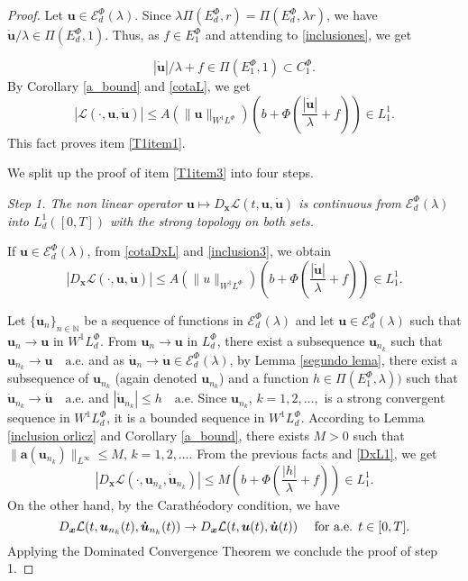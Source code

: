\documentclass[twoside]{article}
\theoremstyle{remark}
\newcommand{\lphi}{L^{\Phi}}
\newcommand{\ephi}{E^{\Phi}}
\newcommand{\claseor}{C^{\Phi}}
\newcommand{\wphi}{W^{1}\lphi}
\newcommand{\sobnor}{\|_{W^{1}\lphi}}
\newcommand{\domi}{\mathcal{E}^{\Phi}_d(\lambda)}
\renewcommand{\b}[1]{\boldsymbol{#1}}
\renewcommand{\leq}{\leqslant}
\begin{document}
\begin{proof} Let $\b{u}\in \domi$.
 Since  $\lambda\Pi(\ephi_d,r)=\Pi(\ephi_d,\lambda r)$, we have   $\b{\dot{u}}/\lambda\in\Pi(\ephi_d,1)$. 
Thus, as $f\in\ephi_1$ and attending to \eqref{inclusiones}, we get 

\begin{equation}\label{inclusion3}
|\b{\dot{u}}|/\lambda+f\in\Pi(\ephi_1,1)\subset \claseor_1.
\end{equation}
By Corollary \ref{a_bound} and \eqref{cotaL}, we get 
 \[|\mathcal{L}(\cdot,\b{u},\b{\dot{u}})| \leq A(\|\b{u}\sobnor ) \left(b+ \Phi\left (\frac{|\b{\dot{u}}|}{\lambda}+f\right)  \right)\in
 L^1_1.\]
This fact proves item \ref{T1item1}.

 We split up the proof of item \ref{T1item3} into four steps.

\noindent\emph{Step 1. The non linear operator  $\b{u} \mapsto D_{\b{x}}\mathcal{L}(t,\b{u},\b{\dot{u}})$ is continuous from $\domi$ into $L^{1}_d([0,T])$ with the strong topology on both sets.} 


If $\b{u}\in \domi$, from \eqref{cotaDxL} and \eqref{inclusion3}, we obtain 
\begin{equation}\label{DxL1}
|D_{\b{x}}\mathcal{L}(\cdot,\b{u},\b{\dot{u}})|\leq A(\|u\sobnor) \left(b+\Phi\left(\frac{|\b{\dot{u}}|}{\lambda}+f\right)\right) \in L^1_1.
\end{equation}


Let   $\{\b{u}_n\}_{n\in \mathbb{N}}$ be a sequence of  functions in $\domi$  and let $\b{u}\in \domi$  such that $\b{u}_n\rightarrow \b{u}$ in $\wphi_d$.
From  $\b{u}_n\rightarrow \b{u}$ in $\lphi_d$, there exist a subsequence $\b{u}_{n_k}$ such that $\b{u}_{n_k}\rightarrow \b{u} \quad\text{a.e.}$ and as $\b{\dot{u}}_n\rightarrow \b{\dot{u}}\in\domi$, by 
  Lemma \ref{segundo lema}, there exist a subsequence of  $\b{u}_{n_k}$ (again denoted $\b{u}_{n_k}$) and a function  $h\in \Pi(\ephi_1,\lambda))$
such that  $\b{\dot{u}}_{n_k}\rightarrow \b{\dot{u}} \quad\text{a.e.}$ and $|\b{\dot{u}}_{n_k}|\leq h\quad\text{a.e}$.  Since $\b{u}_{n_k}$, $k=1,2,\ldots,$ is a strong convergent sequence in $\wphi_d$, it is a bounded sequence in $\wphi_d$. According to Lemma \ref{inclusion orlicz} and Corollary \ref{a_bound}, there exists $M>0$ such that $\|\b{a}(\b{u}_{n_k})\|_{L^{\infty}} \leq M$, $k=1,2,\ldots$.  From the previous facts and \eqref{DxL1}, we get
\begin{equation*}\label{DxL1-bis}
|D_{\b{x}}\mathcal{L}(\cdot,\b{u}_{n_k},\b{\dot{u}}_{n_k})|\leq M\left(b+\Phi\left(\frac{|h|}{\lambda}+f\right)\right) \in L^1_1.
\end{equation*}
On the other hand, by the Carath\'eodory condition, we have
\[D_{\b{x}}\mathcal{L}(t,\b{u}_{n_k}(t),\b{\dot{u}}_{n_k}(t))\to D_{\b{x}}\mathcal{L}(t,\b{u}(t),\b{\dot{u}}(t))\quad\hbox{ for a.e. } t\in[0,T].\]
Applying the Dominated Convergence Theorem we conclude the proof of step 1.


\end{proof}
\end{document}
